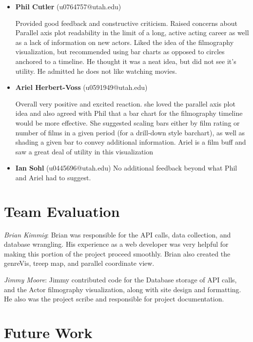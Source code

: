 \documentclass[12pt]{article}
\begin{document}
\begin{itemize}
	\item \textbf{Phil Cutler} (u0764757@utah.edu)
	
	Provided good feedback and constructive criticism. Raised concerns about Parallel axis plot readability in the limit of a long, active acting career as well as a lack of information on new actors. Liked the idea of the filmography visualization, but recommended using bar charts as opposed to circles anchored to a timeline. He thought it was a neat idea, but did not see it's utility. He admitted he does not like watching movies.
	
	
	\item \textbf{Ariel Herbert-Voss} (u0591949@utah.edu)
	
	Overall very positive and excited reaction. she loved the parallel axis plot idea and also agreed with Phil that a bar chart for the filmography timeline would be more effective. She suggested scaling bars either by film rating or number of films in a given period (for a drill-down style barchart), as well as shading a given bar to convey additional information. Ariel is a film buff and saw a great deal of utility in this visualization
	
	\item \textbf{Ian Sohl} (u0445696@utah.edu)
		No additional feedback beyond what Phil and Ariel had to suggest.
\end{itemize}

\newpage

\section{Team Evaluation}

\textit{Brian Kimmig}: Brian was responsible for the API calls, data collection, and database wrangling. His experience as a web developer was very helpful for making this portion of the project proceed smoothly. Brian also created  the genreVis, treep map, and parallel coordinate view.

\textit{Jimmy Moore}: Jimmy contributed code for the Database storage of API calls, and the Actor filmography visualization, along with site design and formatting.  He also was the project scribe and responsible for project documentation.

\newpage

\section{Future Work}
\end{document}
